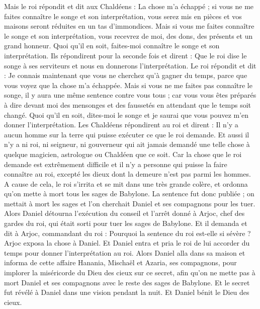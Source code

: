 \begin{multicols}{2}
Mais le roi répondit et dit aux Chaldéens : La chose m'a échappé ; si vous ne me faites connaître le songe et son interprétation, vous serez mis en pièces et vos maisons seront réduites en un tas d'immondices.
Mais si vous me faites connaître le songe et son interprétation, vous recevrez de moi, des dons, des présents et un grand honneur. Quoi qu'il en soit, faites-moi connaître le songe et son interprétation.
Ils répondirent pour la seconde fois et dirent : Que le roi dise le songe à ses serviteurs et nous en donnerons l'interprétation.
Le roi répondit et dit : Je connais maintenant que vous ne cherchez qu'à gagner du temps, parce que vous voyez que la chose m'a échappée.
Mais si vous ne me faites pas connaître le songe, il y aura une même sentence contre vous tous ; car vous vous êtes préparés à dire devant moi des mensonges et des faussetés en attendant que le temps soit changé. Quoi qu'il en soit, dites-moi le songe et je saurai que vous pouvez m'en donner l'interprétation.
Les Chaldéens répondirent au roi et dirent : Il n'y a aucun homme sur la terre qui puisse exécuter ce que le roi demande. Et aussi il n'y a ni roi, ni seigneur, ni gouverneur qui ait jamais demandé une telle chose à quelque magicien, astrologue ou Chaldéen que ce soit.
Car la chose que le roi demande est extrêmement difficile et il n'y a personne qui puisse la faire connaître au roi, excepté les dieux dont la demeure n'est pas parmi les hommes.
A cause de cela, le roi s'irrita et se mit dans une très grande colère, et ordonna qu'on mette à mort tous les sages de Babylone.
La sentence fut donc publiée ; on mettait à mort les sages et l'on cherchait Daniel et ses compagnons pour les tuer.
Alors Daniel détourna l'exécution du conseil et l'arrêt donné à Arjoc, chef des gardes du roi, qui était sorti pour tuer les sages de Babylone.
Et il demanda et dit à Arjoc, commandant du roi : Pourquoi la sentence du roi est-elle si sévère ? Arjoc exposa la chose à Daniel.
Et Daniel entra et pria le roi de lui accorder du temps pour donner l'interprétation au roi.
Alors Daniel alla dans sa maison et informa de cette affaire Hanania, Mischaël et Azaria, ses compagnons,
pour implorer la miséricorde du Dieu des cieux sur ce secret, afin qu'on ne mette pas à mort Daniel et ses compagnons avec le reste des sages de Babylone. 
Et le secret fut révélé à Daniel dans une vision pendant la nuit. Et Daniel bénit le Dieu des cieux.

\end{multicols}
